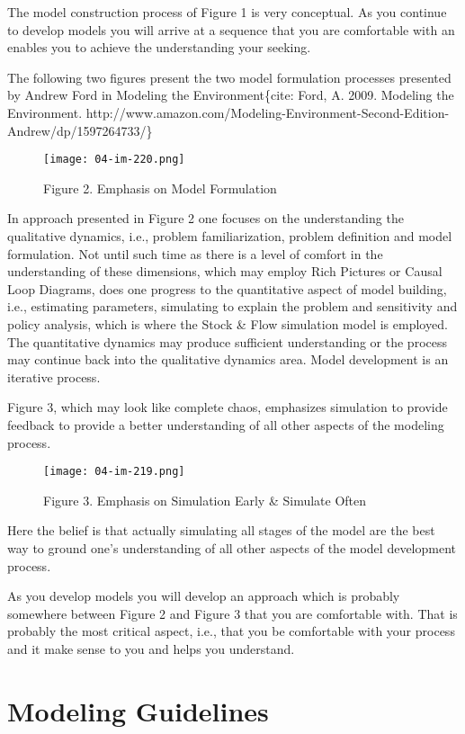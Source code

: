 \documentclass[]{memoir}
\let\Oldincludegraphics\includegraphics
\renewcommand{\includegraphics}[1]{\Oldincludegraphics[max size={\textwidth}{\textheight}]{#1}}
\begin{document}
The model construction process of Figure 1 is very conceptual. As you
continue to develop models you will arrive at a sequence that you are
comfortable with an enables you to achieve the understanding your
seeking.

The following two figures present the two model formulation processes
presented by Andrew Ford in Modeling the Environment\{cite: Ford, A.
2009. Modeling the Environment.
http://www.amazon.com/Modeling-Environment-Second-Edition-Andrew/dp/1597264733/\}

\begin{figure}[htbp]
\centering
\texttt{[image: 04-im-220.png]}
\caption{Figure 2. Emphasis on Model Formulation}
\end{figure}

In approach presented in Figure 2 one focuses on the understanding the
qualitative dynamics, i.e., problem familiarization, problem definition
and model formulation. Not until such time as there is a level of
comfort in the understanding of these dimensions, which may employ Rich
Pictures or Causal Loop Diagrams, does one progress to the quantitative
aspect of model building, i.e., estimating parameters, simulating to
explain the problem and sensitivity and policy analysis, which is where
the Stock \& Flow simulation model is employed. The quantitative
dynamics may produce sufficient understanding or the process may
continue back into the qualitative dynamics area. Model development is
an iterative process.

Figure 3, which may look like complete chaos, emphasizes simulation to
provide feedback to provide a better understanding of all other aspects
of the modeling process.

\begin{figure}[htbp]
\centering
\texttt{[image: 04-im-219.png]}
\caption{Figure 3. Emphasis on Simulation Early \& Simulate Often}
\end{figure}

Here the belief is that actually simulating all stages of the model are
the best way to ground one's understanding of all other aspects of the
model development process.

As you develop models you will develop an approach which is probably
somewhere between Figure 2 and Figure 3 that you are comfortable with.
That is probably the most critical aspect, i.e., that you be comfortable
with your process and it make sense to you and helps you understand.

\section{Modeling Guidelines}
\end{document}
